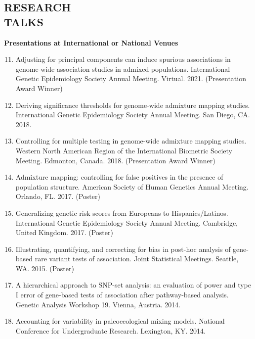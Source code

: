 \documentclass[margin]{res}
\newenvironment{benumerate}[1]{
    \let\oldItem\item
    \def\item{\addtocounter{enumi}{-2}\oldItem}
    
    \begin{enumerate}
    \setcounter{enumi}{#1}
    \addtocounter{enumi}{1}
}{
    \end{enumerate}
}
\begin{document}
\begin{resume}
\section{RESEARCH \\TALKS}

\textbf{Presentations at International or National Venues}

\begin{benumerate}{10}

\item Adjusting for principal components can induce spurious associations in genome-wide association studies in admixed populations. International Genetic Epidemiology Society Annual Meeting. Virtual. 2021. (Presentation Award Winner)

\item %
Deriving significance thresholds for genome-wide admixture mapping studies. International Genetic Epidemiology Society Annual Meeting. San Diego, CA. 2018. 

\item %
Controlling for multiple testing in genome-wide admixture mapping studies. Western North American Region of the International Biometric Society Meeting. Edmonton, Canada. 2018. (Presentation Award Winner)

\item %
Admixture mapping: controlling for false positives in the presence of population structure. American Society of Human Genetics Annual Meeting. Orlando, FL. 2017. (Poster)

\item %
Generalizing genetic risk scores from Europeans to Hispanics/Latinos. International Genetic Epidemiology Society Annual Meeting. Cambridge, United Kingdom. 2017. (Poster)

\item %
Illustrating, quantifying, and correcting for bias in post-hoc analysis of gene-based rare variant tests of association. Joint Statistical Meetings. Seattle, WA. 2015. (Poster)

\item %
A hierarchical approach to SNP-set analysis: an evaluation of power and type I error of gene-based tests of association after pathway-based analysis. Genetic Analysis Workshop 19. Vienna, Austria. 2014.

\item %
Accounting for variability in paleoecological mixing models. National Conference for Undergraduate Research. Lexington, KY. 2014.


\end{benumerate}
\end{resume}
\end{document}
